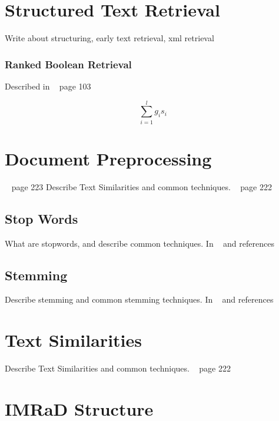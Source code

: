 \section{Structured Text Retrieval}
\label{sec:structured_text_Retrieval}

Write about structuring, early text retrieval, xml retrieval

\subsubsection{Ranked Boolean Retrieval}
\label{sec:ranked_boolean_retrieval}

Described in ~\cite{manning2008} page 103

\begin{equation}
  \sum_{i = 1}^{l}g_i s_i
\end{equation}

\section{Document Preprocessing}
\label{sec:document_preprocessing}

~\cite{ModernInvormationRetrieval1999} page 223
Describe Text Similarities and common techniques. ~\cite{ModernInvormationRetrieval1999} page 222

\subsection{Stop Words}
\label{subsec:stop_words}

What are stopwords, and describe common techniques. In ~\cite{Vijayarani2015} and references

\subsection{Stemming}
\label{subsec:stemming}

Describe stemming and common stemming techniques. In ~\cite{Vijayarani2015} and references

\section{Text Similarities}
\label{sec:text_similarities}

Describe Text Similarities and common techniques. ~\cite{ModernInvormationRetrieval1999} page 222

\section{IMRaD Structure}
\label{sec:imrad_structure}

